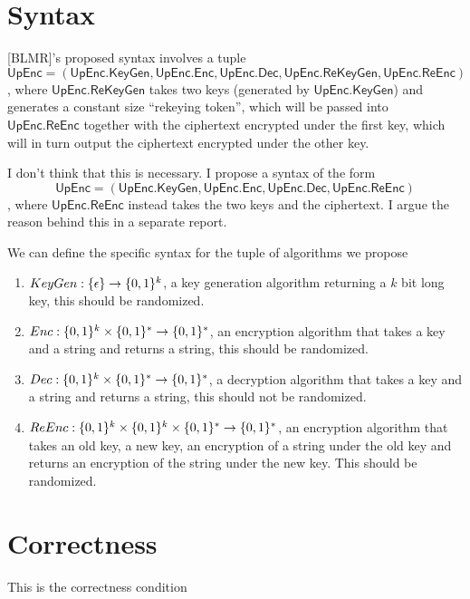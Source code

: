\documentclass[11pt,twoside]{article}
\newcommand{\onlyinsubfile}[1]{#1}
\newcommand{\notinsubfile}[1]{}
\begin{document}
    \renewcommand{\onlyinsubfile}[1]{}
    \renewcommand{\notinsubfile}[1]{#1}
  
\section{Syntax}

[BLMR]'s proposed syntax involves a tuple $$\mathsf{UpEnc = (UpEnc.KeyGen, UpEnc.Enc, UpEnc.Dec, UpEnc.ReKeyGen,UpEnc.ReEnc)}$$, where $\mathsf{UpEnc.ReKeyGen}$ takes two keys (generated by $\mathsf{UpEnc.KeyGen}$) and generates a constant size ``rekeying token'', which will be passed into $\mathsf{UpEnc.ReEnc}$ together with the ciphertext encrypted under the first key, which will in turn output the ciphertext encrypted under the other key. 

I don't think that this is necessary. I propose a syntax of the form $$\mathsf{UpEnc = (UpEnc.KeyGen, UpEnc.Enc, UpEnc.Dec, UpEnc.ReEnc)}$$, where $\mathsf{UpEnc.ReEnc}$ instead takes the two keys and the ciphertext. I argue the reason behind this in a separate report. 

We can define the specific syntax for the tuple of algorithms we propose

\begin{enumerate}
\item $KeyGen:\{\epsilon\}\rightarrow\{0,1\}^k$, a key generation algorithm returning a $k$ bit long key, this should be randomized. 
\item $Enc:\{0,1\}^k\times\{0,1\}^*\rightarrow\{0,1\}^*$, an encryption algorithm that takes a key and a string and returns a string, this should be randomized. 
\item $Dec:\{0,1\}^k\times \{0,1\}^*\rightarrow\{0,1\}^*$, a decryption algorithm that takes a key and a string and returns a string, this should not be randomized.
\item $ReEnc:\{0,1\}^k\times\{0,1\}^k\times\{0,1\}^*\rightarrow\{0,1\}^*$, an encryption algorithm that takes an old key, a new key, an encryption of a string under the old key and returns an encryption of the string under the new key. This should be randomized. 
\end{enumerate} 

\section{Correctness}
This is the correctness condition 
\end{document}
